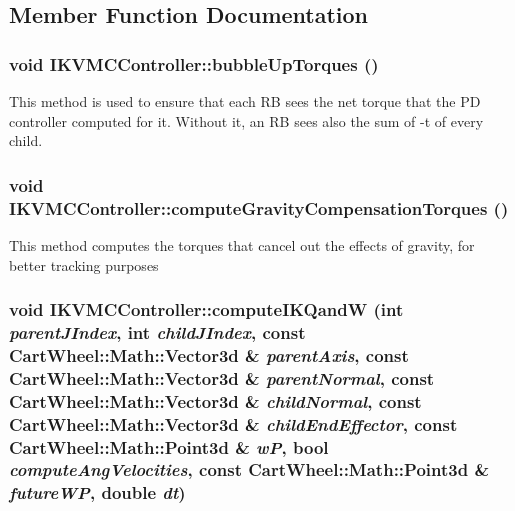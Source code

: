\subsection{Member Function Documentation}
\hypertarget{classCartWheel_1_1Core_1_1IKVMCController_af799a5e27207189e5b946cf063b4667d}{
\subsubsection[{bubbleUpTorques}]{\setlength{\rightskip}{0pt plus 5cm}void IKVMCController::bubbleUpTorques ()}}
\label{classCartWheel_1_1Core_1_1IKVMCController_af799a5e27207189e5b946cf063b4667d}
This method is used to ensure that each RB sees the net torque that the PD controller computed for it. Without it, an RB sees also the sum of -\/t of every child. \hypertarget{classCartWheel_1_1Core_1_1IKVMCController_a8364bad704f18fcb36eef6d0d4fd9e16}{
\subsubsection[{computeGravityCompensationTorques}]{\setlength{\rightskip}{0pt plus 5cm}void IKVMCController::computeGravityCompensationTorques ()}}
\label{classCartWheel_1_1Core_1_1IKVMCController_a8364bad704f18fcb36eef6d0d4fd9e16}
This method computes the torques that cancel out the effects of gravity, for better tracking purposes \hypertarget{classCartWheel_1_1Core_1_1IKVMCController_a6e379111a67bc1fae067aa643dc2b5a8}{
\subsubsection[{computeIKQandW}]{\setlength{\rightskip}{0pt plus 5cm}void IKVMCController::computeIKQandW (int {\em parentJIndex}, \/  int {\em childJIndex}, \/  const {\bf CartWheel::Math::Vector3d} \& {\em parentAxis}, \/  const {\bf CartWheel::Math::Vector3d} \& {\em parentNormal}, \/  const {\bf CartWheel::Math::Vector3d} \& {\em childNormal}, \/  const {\bf CartWheel::Math::Vector3d} \& {\em childEndEffector}, \/  const {\bf CartWheel::Math::Point3d} \& {\em wP}, \/  bool {\em computeAngVelocities}, \/  const {\bf CartWheel::Math::Point3d} \& {\em futureWP}, \/  double {\em dt})}}

